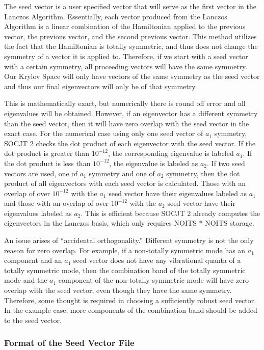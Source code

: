 \documentclass{article}
\begin{document}
The seed vector is a user specified vector that will serve as the first vector in the Lanczos Algorithm. Essentially, each vector produced from the Lanczos Algorithm is a linear combination of the Hamiltonian applied to the previous vector, the previous vector, and the second previous vector. This method utilizes the fact that the Hamiltonian is totally symmetric, and thus does not change the symmetry of a vector it is applied to. Therefore, if we start with a seed vector with a certain symmetry, all proceeding vectors will have the same symmetry. Our Krylov Space will only have vectors of the same symmetry as the seed vector and thus our final eigenvectors will only be of that symmetry.

This is mathematically exact, but numerically there is round off error and all eigenvalues will be obtained. However, if an eigenvector has a different symmetry than the seed vector, then it will have zero overlap with the seed vector in the exact case. For the numerical case using only one seed vector of $a_1$ symmetry, SOCJT 2 checks the dot product of each eigenvector with the seed vector. If the dot product is greater than $10^{-12}$, the corresponding eigenvalue is labeled $a_1$. If the dot product is less than $10^{-12}$, the eigenvalue is labeled as $a_2$. If two seed vectors are used, one of $a_1$ symmetry and one of $a_2$ symmetry, then the dot product of all eigenvectors with each seed vector is calculated. Those with an overlap of over $10^{-12}$ with the $a_1$ seed vector have their eigenvalues labeled as $a_1$ and those with an overlap of over $10^{-12}$ with the $a_2$ seed vector have their eigenvalues labeled as $a_2$. This is efficient because SOCJT 2 already computes the eigenvectors in the Lanczos basis, which only requires NOITS $*$ NOITS storage.

An issue arises of ``accidental orthogonality.'' Different symmetry is not the only reason for zero overlap. For example, if a non-totally symmetric mode has an $a_1$ component and an $a_1$ seed vector does not have any vibrational quanta of a totally symmetric mode, then the combination band of the totally symmetric mode and the $a_1$ component of the non-totally symmetric mode will have zero overlap with the seed vector, even though they have the same symmetry. Therefore, some thought is required in choosing a sufficiently robust seed vector. In the example case, more components of the combination band should be added to the seed vector.

\subsubsection{Format of the Seed Vector File} \label{seedformat}
\end{document}

